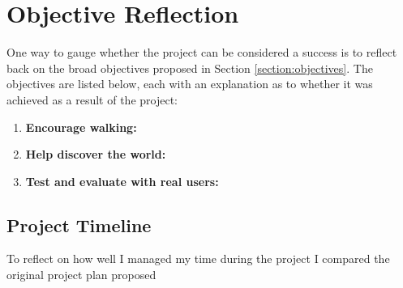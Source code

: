\section{Objective Reflection}


One way to gauge whether the project can be considered a success is to reflect back on the broad objectives proposed in Section \ref{section:objectives}. The objectives are listed below, each with an explanation as to whether it was achieved as a result of the project:

\begin{enumerate}[label=\textbf{Obj \arabic*}]
  \item \textbf{Encourage walking:}
  \item \textbf{Help discover the world:}
  \item \textbf{Test and evaluate with real users:}
\end{enumerate}

\subsection{Project Timeline}


To reflect on how well I managed my time during the project I compared the original project plan proposed 

